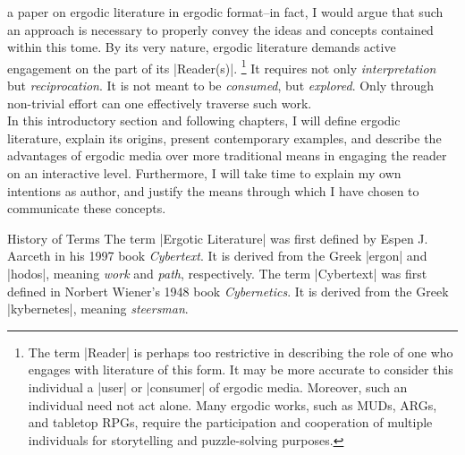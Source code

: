 \documentclass[10pt,twoside,twocolumn,openany,nomultitoc]{book}
\begin{document}
 a paper on ergodic literature in ergodic format--in fact, I would argue that such an approach is necessary to properly convey the ideas and concepts contained within this tome. By its very nature, ergodic literature demands active engagement on the part of its 
|Reader(s)|.%
    \footnote{The term |Reader| is perhaps too restrictive in describing the role of one who engages with literature of this form. It may be more accurate to consider this individual a |user| or |consumer| of ergodic media. Moreover, such  an individual need not act alone. Many ergodic works, such as MUDs, ARGs, and tabletop RPGs, require the participation and cooperation of multiple individuals for storytelling and puzzle-solving purposes.}         
It requires not only \textit{interpretation} but \textit{reciprocation}. It is not meant to be \textit{consumed}, but \textit{explored}. Only through non-trivial effort can one effectively traverse such work. \\ 

In this introductory section and following chapters, I will define ergodic literature, explain its origins, present contemporary examples, and describe the advantages of ergodic media over more traditional means in engaging the reader on an interactive level. Furthermore, I will take time to explain my own intentions as author, and justify the means through which I have chosen to communicate these concepts.

\begin{DndSidebar}[]{History of Terms}
    The term |Ergotic Literature| was first defined by Espen J. Aarceth in his 1997 book \textit{Cybertext}. It is derived from the Greek |ergon| and |hodos|, meaning \textit{work} and \textit{path}, respectively. The term |Cybertext| was first defined in Norbert Wiener's 1948 book \textit{Cybernetics}. It is derived from the Greek |kybernetes|, meaning \textit{steersman}.
\end{DndSidebar}
    
\end{document}
